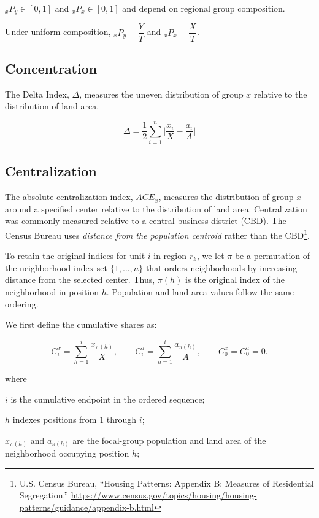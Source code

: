 \documentclass{report}[11pt,letterpaper]
\begin{document}
${}_{x}P_y \in [0,1]$ and ${}_{x}P_x \in [0,1]$ and depend on regional group composition.

Under uniform composition, ${}_{x}P_y=\dfrac{Y}{T}$ and
${}_{x}P_x=\dfrac{X}{T}$.

\subsection{Concentration}

The Delta Index, $\Delta$, measures the uneven distribution of group $x$ relative to the distribution of land area.

\begin{equation} 
\Delta = \dfrac{1}{2} \sum_{i=1}^{n} \Big| \dfrac{x_i}{X} - \dfrac{a_i}{A} \Big|
\end{equation}

\subsection{Centralization}

The absolute centralization index, $ACE_x$, measures
the distribution of group $x$ around a specified center
relative to the distribution of land area. Centralization
was commonly measured relative to a central business
district (CBD). The Census Bureau uses
\textit{distance from the population centroid} rather than the
CBD\footnote{U.S. Census Bureau, ``Housing Patterns:
Appendix B: Measures of Residential Segregation.''
\url{https://www.census.gov/topics/housing/housing-patterns/guidance/appendix-b.html}}.

To retain the original indices for unit $i$ in region $r_k$, we let $\pi$ be a permutation of the neighborhood index
set $\{1,\ldots,n\}$ that orders neighborhoods by increasing
distance from the selected center. Thus, $\pi(h)$ is the
original index of the neighborhood in position $h$.
Population and land-area values follow the same ordering.

We first define the cumulative shares as:

\[
C_i^x = \sum_{h=1}^{i} \dfrac{x_{\pi(h)}}{X},
\qquad
C_i^a = \sum_{h=1}^{i} \dfrac{a_{\pi(h)}}{A},
\qquad
C_0^x=C_0^a=0.
\]

\noindent
where 

$i$ is the cumulative endpoint in the ordered
sequence; 

$h$ indexes positions from $1$ through $i$; 

$x_{\pi(h)}$ and $a_{\pi(h)}$ are the focal-group
population and land area of the neighborhood occupying
position $h$; 
\end{document}
